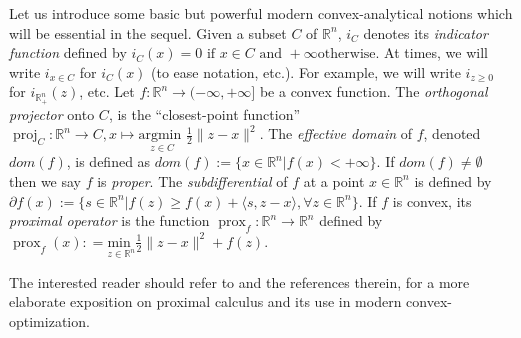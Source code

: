 \documentclass[a4paper,9pt]{extarticle}
\DeclareMathOperator{\proj}{proj}
\DeclareMathOperator{\prox}{prox}
\begin{document}
Let us introduce some basic but powerful modern convex-analytical
notions which will be essential in the sequel. Given a subset $C$ of
$\mathbb{R}^n$, $i_C$ denotes its \textit{indicator function} defined
by $i_C(x) = 0 \text{ if } x \in C\text{ and }+\infty\text{
    otherwise}$.
At times, we will write $i_{x \in C}$ for $i_C(x)$ (to ease notation,
etc.). For example, we will write $i_{z \ge 0}$ for
$i_{\mathbb{R}^n_+}(z)$, etc. Let $f : \mathbb{R}^n \rightarrow
(-\infty, +\infty]$ be a
  convex function. The \textit{orthogonal projector} onto $C$, is the
  ``closest-point function'' $\proj_C: \mathbb{R}^n \rightarrow C, x
  \mapsto \underset{z \in
      C}{\text{argmin }}\frac{1}{2}\|z-x\|^2$.
The \textit{effective domain} of $f$, denoted
  $dom(f)$, is defined as
$dom(f) := \{x \in \mathbb{R}^n | f(x) < +\infty\}$.
 If $dom(f) \ne \emptyset$ then we say $f$ is \textit{proper}.
The \textit{subdifferential} of $f$ at a point $x \in \mathbb{R}^n$ is
defined by
$\partial f(x) := \{s\in \mathbb{R}^n | f(z)  \ge f(x) + \langle s, z -
x\rangle, \forall z \in \mathbb{R}^n\}$.
If $f$ is convex, its
\textit{proximal operator} is the function $\prox_f: \mathbb{R}^n
\rightarrow \mathbb{R}^n$ defined by $\prox_f(x): = \underset{z \in
  \mathbb{R}^n}{\text{min }}\frac{1}{2}\|z
  - x\|^2 + f(z)$.

The interested reader should refer to \cite{combettes2011proximal} and
the references therein, for a more elaborate exposition on
proximal calculus and its use in modern convex-optimization.
\end{document}
